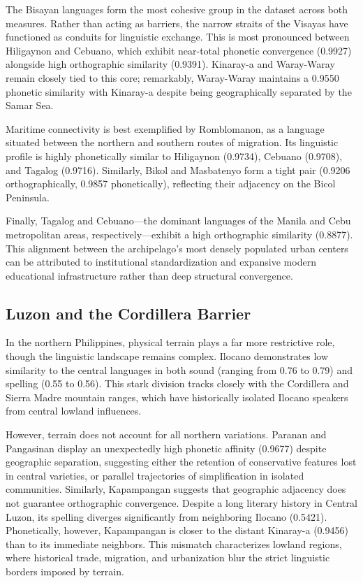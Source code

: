 The Bisayan languages form the most cohesive group in the dataset across both
measures. Rather than acting as barriers, the narrow straits of the Visayas
have functioned as conduits for linguistic exchange. This is most pronounced
between Hiligaynon and Cebuano, which exhibit near-total phonetic convergence
(0.9927) alongside high orthographic similarity (0.9391). Kinaray-a and
Waray-Waray remain closely tied to this core; remarkably, Waray-Waray maintains
a 0.9550 phonetic similarity with Kinaray-a despite being geographically
separated by the Samar Sea.

Maritime connectivity is best exemplified by Romblomanon, as a language
situated between the northern and southern routes of migration. Its linguistic
profile is highly phonetically similar to Hiligaynon (0.9734), Cebuano
(0.9708), and Tagalog (0.9716). Similarly, Bikol and Masbatenyo form a tight
pair (0.9206 orthographically, 0.9857 phonetically), reflecting their adjacency
on the Bicol Peninsula.

Finally, Tagalog and Cebuano—the dominant languages of the Manila and Cebu
metropolitan areas, respectively—exhibit a high orthographic similarity
(0.8877). This alignment between the archipelago's most densely populated urban
centers can be attributed to institutional standardization and expansive modern
educational infrastructure rather than deep structural convergence.

\subsection{Luzon and the Cordillera Barrier}

In the northern Philippines, physical terrain plays a far more restrictive
role, though the linguistic landscape remains complex. Ilocano demonstrates low
similarity to the central languages in both sound (ranging from 0.76 to 0.79)
and spelling (0.55 to 0.56). This stark division tracks closely with the
Cordillera and Sierra Madre mountain ranges, which have historically isolated
Ilocano speakers from central lowland influences.

However, terrain does not account for all northern variations. Paranan and
Pangasinan display an unexpectedly high phonetic affinity (0.9677) despite
geographic separation, suggesting either the retention of conservative features
lost in central varieties, or parallel trajectories of simplification in
isolated communities. Similarly, Kapampangan suggests that geographic adjacency
does not guarantee orthographic convergence. Despite a long literary history in
Central Luzon, its spelling diverges significantly from neighboring Ilocano
(0.5421). Phonetically, however, Kapampangan is closer to the distant Kinaray-a
(0.9456) than to its immediate neighbors. This mismatch characterizes lowland
regions, where historical trade, migration, and urbanization blur the strict
linguistic borders imposed by terrain.

